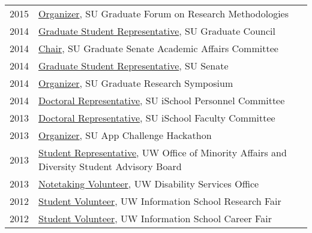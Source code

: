 \documentclass[11pt]{article}
\begin{document}
{{\begin{longtable}{Rp{0.75in}p{5.0in}}
\footnotesize{2015} & \href{http://gradresearch.syr.edu}{Organizer}, SU Graduate Forum on Research Methodologies\\

\footnotesize{2014} & \href{http://gradorg.syr.edu/senate/committees/}{Graduate Student Representative}, SU Graduate Council\\

\footnotesize{2014} & \href{http://gradorg.syr.edu/senate/committees/}{Chair}, SU Graduate Senate Academic Affairs Committee\\

\footnotesize{2014} & \href{http://universitysenate.syr.edu/}{Graduate Student Representative}, SU Senate\\

\footnotesize{2014} & \href{https://www.facebook.com/pg/sugrads/photos/?tab=album&album_id=874022975972914}{Organizer}, SU Graduate Research Symposium\\

\footnotesize{2014} & \href{https://ischool.syr.edu/}{Doctoral Representative}, SU iSchool Personnel Committee\\

\footnotesize{2013} & \href{https://ischool.syr.edu/}{Doctoral Representative}, SU iSchool Faculty Committee\\

\footnotesize{2013} & \href{http://dailyorange.com/2013/12/su-app-challenge-to-announce-winners-thursday/}{Organizer}, SU App Challenge Hackathon\\

\footnotesize{2013} & \href{https://www.washington.edu/omad/2014/05/09/no-longer-invisible-bryan-dosono/}{Student Representative}, UW Office of Minority Affairs and Diversity Student Advisory Board\\

\footnotesize{2013} & \href{https://depts.washington.edu/uwdrs/current-students/accommodations/notetaking/}{Notetaking Volunteer}, UW Disability Services Office\\

\footnotesize{2012} & \href{https://ischool.uw.edu/current/career-services}{Student Volunteer}, UW Information School Research Fair\\

\footnotesize{2012} & \href{https://web.archive.org/web/20130104065107/https://ischool.uw.edu/news/2012/11/annual-ischool-research-fair-showcases-faculty-and-student-work}{Student Volunteer}, UW Information School Career Fair\\


\end{longtable}}}
\end{document}
